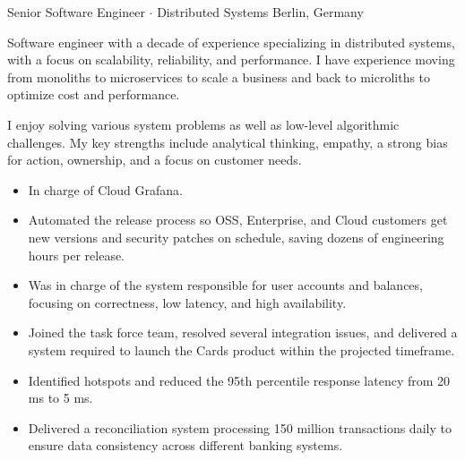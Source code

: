 \documentclass[a4paper,10pt]{article}
\begin{document}
    {Senior Software Engineer $\cdot$ Distributed Systems}
    {Berlin, Germany}

    \begin{lede}
        Software engineer with a decade of experience specializing in distributed systems, with a focus on scalability, reliability, and performance.
        I have experience moving from monoliths to microservices to scale a business and back to microliths
        to optimize cost and performance.

        \vspace{5pt}

        I enjoy solving various system problems as well as low-level algorithmic challenges.
        My key strengths include analytical thinking, empathy, a strong bias for action, ownership, and a focus on customer needs.
    \end{lede}

    \begin{skills}
    \end{skills}



    \begin{itemize}
        \item In charge of Cloud Grafana.
        \item Automated the release process so OSS, Enterprise, and Cloud customers get new versions
        and security patches on schedule, saving dozens of engineering hours per release.
    \end{itemize}

    \begin{itemize}
        \item Was in charge of the system responsible for user accounts and balances, focusing on correctness, low latency, and high availability.
        \item Joined the task force team, resolved several integration issues, and delivered a system required to launch the Cards product within the projected timeframe.
        \item Identified hotspots and reduced the 95th percentile response latency from 20 ms to 5 ms.
        \item Delivered a reconciliation system processing 150 million transactions daily to ensure data consistency across different banking systems.
    \end{itemize}
\end{document}

